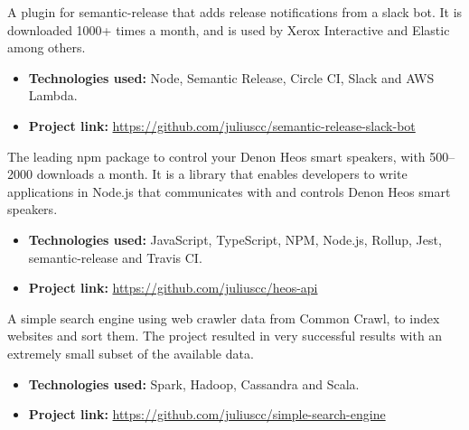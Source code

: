 



A plugin for semantic-release that adds release notifications from a slack bot. It is downloaded 1000+ times a month, and is used by Xerox Interactive and Elastic among others.

\vspace{6pt}

\begin{itemize}
    \item \textbf{Technologies used:} Node, Semantic Release, Circle CI, Slack and AWS Lambda.
    \item \textbf{Project link:} \href{https://github.com/juliuscc/semantic-release-slack-bot}{https://github.com/juliuscc/semantic-release-slack-bot}
\end{itemize}

\divider


The leading npm package to control your Denon Heos smart speakers, with 500--2000 downloads a month. It is a library that enables developers to write applications in Node.js that communicates with and controls Denon Heos smart speakers.

\vspace{6pt}

\begin{itemize}
    \item \textbf{Technologies used:} JavaScript, TypeScript, NPM, Node.js, Rollup, Jest, semantic-release and Travis CI.
    \item \textbf{Project link:} \href{https://github.com/juliuscc/heos-api}{https://github.com/juliuscc/heos-api}
\end{itemize}

\divider

A simple search engine using web crawler data from Common Crawl, to index websites and sort them. The project resulted in very successful results with an extremely small subset of the available data.

\vspace{6pt}

\begin{itemize}
    \item \textbf{Technologies used:} Spark, Hadoop, Cassandra and Scala.
    \item \textbf{Project link:} \href{https://github.com/juliuscc/simple-search-engine}{https://github.com/juliuscc/simple-search-engine}
\end{itemize}

